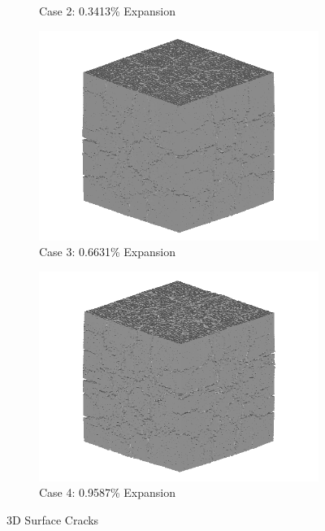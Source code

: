 \begin{figure}[!h]
\begin{subfigure}{.5\textwidth}
    \caption{Case 2: 0.3413\% Expansion}
    \end{subfigure}%
    \begin{subfigure}{.5\textwidth}
      \centering
      \includegraphics[width=.8\linewidth]{Files/exp_3D/DEF/A15X0C_3_3d.png}
    \caption{Case 3: 0.6631\% Expansion}
    \end{subfigure}
    \begin{subfigure}{.5\textwidth}
      \centering
      \includegraphics[width=.8\linewidth]{Files/exp_3D/DEF/A15X0C_4_3d.png}
    \caption{Case 4: 0.9587\% Expansion}
    \end{subfigure}%

  \caption{3D Surface Cracks}
  \label{fig:DEF_A15X0C_3D}
\end{figure}

